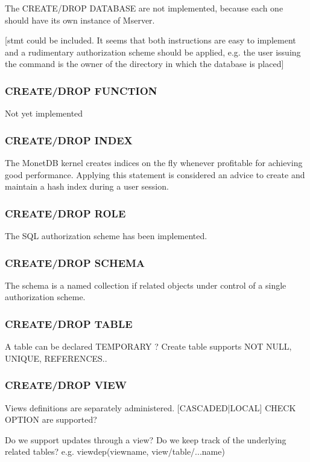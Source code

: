 \documentclass[10pt,twocolumn,fleqn]{article}
\begin{document}
The CREATE/DROP DATABASE are not implemented, because each one
should have its own instance of Mserver.

[stmt could be included. It seems that both instructions are
easy to implement and a rudimentary authorization scheme should be
applied, e.g. the user issuing the command is the owner of the directory
in which the database is placed]

\subsubsection*{CREATE/DROP FUNCTION}
Not yet implemented

\subsubsection*{CREATE/DROP INDEX}

The MonetDB kernel creates indices on the fly whenever profitable for
achieving good performance. Applying this statement is considered
an advice to create and maintain a hash index during a user session.

\subsubsection*{CREATE/DROP ROLE}
The SQL authorization scheme has been implemented.

\subsubsection*{CREATE/DROP SCHEMA}
The schema is a named collection if related objects under control of
a single authorization scheme. 

\subsubsection*{CREATE/DROP TABLE}
A table can be declared TEMPORARY ?
Create table supports NOT NULL, UNIQUE, REFERENCES..

\subsubsection*{CREATE/DROP VIEW}
Views definitions are separately administered.
[CASCADED|LOCAL] CHECK OPTION are supported?

Do we support updates through a view?
Do we keep track of the underlying related tables? e.g.
viewdep(viewname, view/table/...name)
\end{document}
